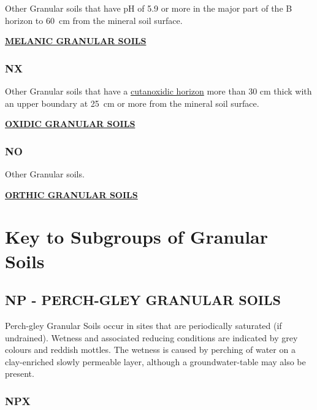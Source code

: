 \documentclass[
  letterpaper,
  DIV=11,
  numbers=noendperiod]{scrreprt}
\begin{document}
Other Granular soils that have pH of 5.9 or more in the major part of
the B horizon to 60~cm from the mineral soil surface.

\protect\hyperlink{sec-NE}{\textbf{MELANIC GRANULAR SOILS}}

\hypertarget{sec-key-NX}{%
\subsubsection{\texorpdfstring{\textbf{NX}}{NX}}\label{sec-key-NX}}

Other Granular soils that have a
\protect\hyperlink{sec-diag-cutoxh}{cutanoxidic horizon} more than 30 cm
thick with an upper boundary at 25~cm or more from the mineral soil
surface.

\protect\hyperlink{sec-NX}{\textbf{OXIDIC GRANULAR SOILS}}

\hypertarget{sec-key-NO}{%
\subsubsection{\texorpdfstring{\textbf{NO}}{NO}}\label{sec-key-NO}}

Other Granular soils.

\protect\hyperlink{sec-NO}{\textbf{ORTHIC GRANULAR SOILS}}

\hypertarget{sec-sub-N}{%
\section{Key to Subgroups of Granular Soils}\label{sec-sub-N}}

\hypertarget{sec-NP}{%
\subsection{\texorpdfstring{\textbf{NP} - PERCH-GLEY GRANULAR
SOILS}{NP - PERCH-GLEY GRANULAR SOILS}}\label{sec-NP}}

Perch-gley Granular Soils occur in sites that are periodically saturated
(if undrained). Wetness and associated reducing conditions are indicated
by grey colours and reddish mottles. The wetness is caused by perching
of water on a clay-enriched slowly permeable layer, although a
groundwater-table may also be present.

\hypertarget{sec-key-NPX}{%
\subsubsection{\texorpdfstring{\textbf{NPX}}{NPX}}\label{sec-key-NPX}}
\end{document}
